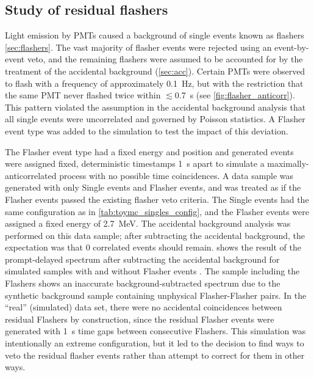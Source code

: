 \subsection{Study of residual flashers}
\label{subsec:toymc_flashers}

Light emission by PMTs caused a background of single events
known as flashers \cref{sec:flashers}.
The vast majority of flasher events were rejected using an event-by-event veto,
and the remaining flashers were assumed to be accounted for
by the treatment of the accidental background (\cref{sec:acc}).
Certain PMTs were observed to flash with a frequency
of approximately \SI{0.1}{\Hz},
but with the restriction that
the same PMT never flashed twice within $\lesssim$\SI{0.7}{\s}
(see \cref{fig:flasher_anticorr}).
This pattern violated the assumption in the accidental background analysis
that all single events were uncorrelated and governed by Poisson statistics.
A Flasher event type was added to the simulation to test the impact of this deviation.

The Flasher event type had a fixed energy and position
and generated events were assigned fixed, deterministic timestamps \SI{1}{\s} apart
to simulate a maximally-anticorrelated process with no possible time coincidences.
A data sample was generated with only Single events and Flasher events,
and was treated as if the Flasher events passed the existing flasher veto criteria.
The Single events had the same configuration as in \cref{tab:toymc_singles_config},
and the Flasher events were assigned a fixed energy of \SI{2.7}{\MeV}.
The accidental background analysis was performed on this data sample;
after subtracting the accidental background,
the expectation was that 0 correlated events should remain.
 shows the result of the prompt-delayed spectrum
after subtracting the accidental background
for simulated samples with and without Flasher events \cite{flasher_sim}.
The sample including the Flashers shows
an inaccurate background-subtracted spectrum
due to the synthetic background sample containing unphysical Flasher-Flasher pairs.
In the ``real'' (simulated) data set,
there were no accidental coincidences between residual Flashers by construction,
since the residual Flasher events were generated with \SI{1}{\s} time gaps
between consecutive Flashers.
This simulation was intentionally an extreme configuration,
but it led to the decision to find ways to veto the residual flasher events
rather than attempt to correct for them in other ways.


